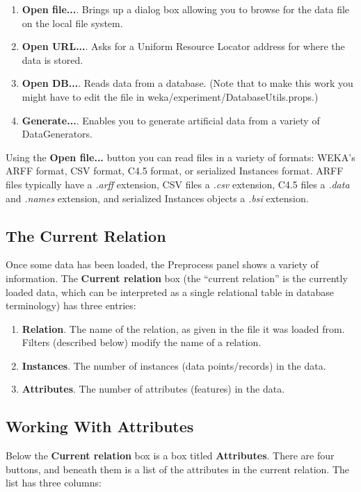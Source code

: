 \documentclass[a4paper]{article}
\begin{document}
\begin{enumerate}
\item \textbf{Open file...}.
Brings up a dialog box allowing you to browse for the data file on the local
file system.
\item \textbf{Open URL...}.
Asks for a Uniform Resource Locator address for where the data is stored.
\item \textbf{Open DB...}.  Reads data from a database. (Note that to
make this work you might have to edit the file in
weka/experiment/DatabaseUtils.props.)
\item \textbf{Generate...}.  Enables you to generate artificial data
from a variety of DataGenerators.
\end{enumerate}
\noindent
Using the \textbf{Open file...} button you can read files in a variety
of formats: WEKA's ARFF format, CSV format, C4.5 format, or serialized
Instances format. ARFF files typically have a {\em .arff\/}
extension, CSV files a {\em .csv\/} extension, C4.5 files a {\em
.data\/} and {\em .names\/} extension, and serialized Instances
objects a {\em .bsi\/} extension.

\subsection{The Current Relation}

Once some data has been loaded, the Preprocess panel shows a variety
of information.  The \textbf{Current relation} box (the ``current
relation'' is the currently loaded data, which can be interpreted as a
single relational table in database terminology)  has three entries:

\begin{enumerate}
\item \textbf{Relation}.
The name of the relation, as given in the file it was loaded from. Filters
(described below) modify the name of a relation. 
\item \textbf{Instances}.
The number of instances (data points/records) in the data.
\item \textbf{Attributes}.
The number of attributes (features) in the data.
\end{enumerate}

\subsection{Working With Attributes}

Below the \textbf{Current relation} box is a box titled \textbf{Attributes}.
There are four buttons, and beneath them is a list of the attributes in the
current relation. The list has three columns:
\end{document}
